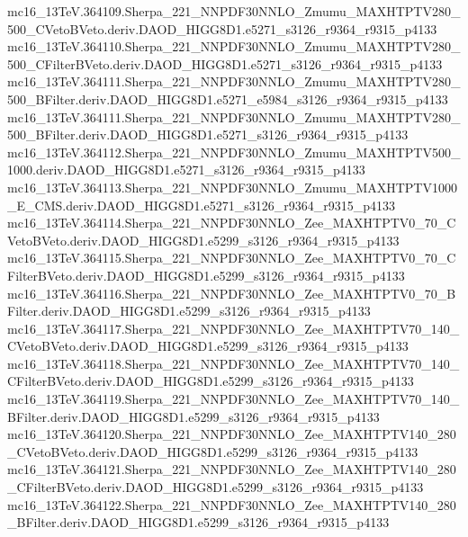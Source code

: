 \begin{scriptsize}
mc16\_13TeV.364109.Sherpa\_221\_NNPDF30NNLO\_Zmumu\_MAXHTPTV280\_500\_CVetoBVeto.deriv.DAOD\_HIGG8D1.e5271\_s3126\_r9364\_r9315\_p4133 \\
mc16\_13TeV.364110.Sherpa\_221\_NNPDF30NNLO\_Zmumu\_MAXHTPTV280\_500\_CFilterBVeto.deriv.DAOD\_HIGG8D1.e5271\_s3126\_r9364\_r9315\_p4133 \\
mc16\_13TeV.364111.Sherpa\_221\_NNPDF30NNLO\_Zmumu\_MAXHTPTV280\_500\_BFilter.deriv.DAOD\_HIGG8D1.e5271\_e5984\_s3126\_r9364\_r9315\_p4133 \\
mc16\_13TeV.364111.Sherpa\_221\_NNPDF30NNLO\_Zmumu\_MAXHTPTV280\_500\_BFilter.deriv.DAOD\_HIGG8D1.e5271\_s3126\_r9364\_r9315\_p4133 \\
mc16\_13TeV.364112.Sherpa\_221\_NNPDF30NNLO\_Zmumu\_MAXHTPTV500\_1000.deriv.DAOD\_HIGG8D1.e5271\_s3126\_r9364\_r9315\_p4133 \\
mc16\_13TeV.364113.Sherpa\_221\_NNPDF30NNLO\_Zmumu\_MAXHTPTV1000\_E\_CMS.deriv.DAOD\_HIGG8D1.e5271\_s3126\_r9364\_r9315\_p4133 \\
mc16\_13TeV.364114.Sherpa\_221\_NNPDF30NNLO\_Zee\_MAXHTPTV0\_70\_CVetoBVeto.deriv.DAOD\_HIGG8D1.e5299\_s3126\_r9364\_r9315\_p4133 \\
mc16\_13TeV.364115.Sherpa\_221\_NNPDF30NNLO\_Zee\_MAXHTPTV0\_70\_CFilterBVeto.deriv.DAOD\_HIGG8D1.e5299\_s3126\_r9364\_r9315\_p4133 \\
mc16\_13TeV.364116.Sherpa\_221\_NNPDF30NNLO\_Zee\_MAXHTPTV0\_70\_BFilter.deriv.DAOD\_HIGG8D1.e5299\_s3126\_r9364\_r9315\_p4133 \\
mc16\_13TeV.364117.Sherpa\_221\_NNPDF30NNLO\_Zee\_MAXHTPTV70\_140\_CVetoBVeto.deriv.DAOD\_HIGG8D1.e5299\_s3126\_r9364\_r9315\_p4133 \\
mc16\_13TeV.364118.Sherpa\_221\_NNPDF30NNLO\_Zee\_MAXHTPTV70\_140\_CFilterBVeto.deriv.DAOD\_HIGG8D1.e5299\_s3126\_r9364\_r9315\_p4133 \\
mc16\_13TeV.364119.Sherpa\_221\_NNPDF30NNLO\_Zee\_MAXHTPTV70\_140\_BFilter.deriv.DAOD\_HIGG8D1.e5299\_s3126\_r9364\_r9315\_p4133 \\
mc16\_13TeV.364120.Sherpa\_221\_NNPDF30NNLO\_Zee\_MAXHTPTV140\_280\_CVetoBVeto.deriv.DAOD\_HIGG8D1.e5299\_s3126\_r9364\_r9315\_p4133 \\
mc16\_13TeV.364121.Sherpa\_221\_NNPDF30NNLO\_Zee\_MAXHTPTV140\_280\_CFilterBVeto.deriv.DAOD\_HIGG8D1.e5299\_s3126\_r9364\_r9315\_p4133 \\
mc16\_13TeV.364122.Sherpa\_221\_NNPDF30NNLO\_Zee\_MAXHTPTV140\_280\_BFilter.deriv.DAOD\_HIGG8D1.e5299\_s3126\_r9364\_r9315\_p4133 \\

\end{scriptsize}
